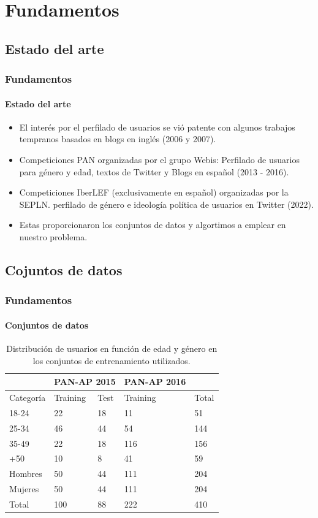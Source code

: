 \documentclass{beamer}
\begin{document}
\section{Fundamentos}
		
		\subsection{Estado del arte}
		\begin{frame}
			\frametitle{Fundamentos}
			\framesubtitle{Estado del arte}
			\begin{itemize}
				\item El interés por el perfilado de usuarios se vió patente con algunos trabajos tempranos basados en blogs en inglés (2006 y 2007).%
				\item Competiciones PAN organizadas por el grupo Webis:
				Perfilado de usuarios para género y edad, textos de Twitter y Blogs en español (2013 - 2016).
				\item Competiciones IberLEF (exclusivamente en español) organizadas por la SEPLN.
				perfilado de género e ideología política de usuarios en Twitter (2022).
				\item Estas proporcionaron los conjuntos de datos y algortimos a emplear en nuestro problema.
			\end{itemize}
		\end{frame}
		\subsection{Cojuntos de datos}
		\begin{frame}
			\frametitle{Fundamentos}
			\framesubtitle{Conjuntos de datos}
			\begin{table}[hp!]
				\centering
				\begin{tabular}{|l|ll|l|l|}
					\hhline{~---~}
					\multicolumn{1}{c|}{} & \multicolumn{2}{c|}{\textbf{PAN-AP 2015}} & \textbf{PAN-AP 2016} & \multicolumn{1}{c}{}\\ \hline
					Categoría & Training & Test & Training & Total\\ \hline
					18-24 & 22 & 18 & 11 & 51\\
					25-34 & 46 & 44 & 54 & 144\\
					35-49 & 22 & 18 & 116 & 156\\
					+50 & 10 & 8 & 41 & 59\\ \hline
					Hombres & 50 & 44 & 111 & 204\\
					Mujeres & 50 & 44 & 111 & 204\\ \hline
					Total & 100 & 88 & 222 & 410\\ \hline  
				\end{tabular}%
				\caption{Distribución de usuarios en función de edad y género en los conjuntos de entrenamiento utilizados.}
				\label{tab:datasets_edad}
			\end{table}
		\end{frame}
		
\end{document}
